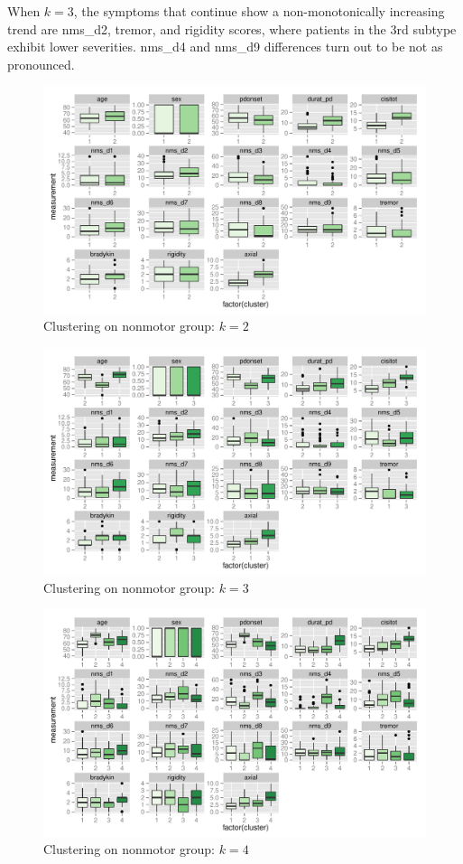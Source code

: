 \documentclass[10pt]{article}
\begin{document}
\begin{multicols}{2}
When $k = 3$, the symptoms that continue show a non-monotonically increasing
trend are nms\_d2, tremor, and rigidity scores, where patients in the 3rd
subtype exhibit lower severities. nms\_d4 and nms\_d9 differences turn out to be
not as pronounced.

\begin{figure}[p]
  \centering
  \includegraphics[width=0.65\linewidth]{c2-summaries-2.pdf}
  \caption{Clustering on nonmotor group: $k = 2$}
  \label{fig:c2-summaries-2}
\end{figure}
\begin{figure}[p]
  \centering
  \includegraphics[width=0.65\linewidth]{c2-summaries-3.pdf}
  \caption{Clustering on nonmotor group: $k = 3$}
  \label{fig:c2-summaries-3}
\end{figure}
\begin{figure}[p]
  \centering
  \includegraphics[width=0.65\linewidth]{c2-summaries-4.pdf}
  \caption{Clustering on nonmotor group: $k = 4$}
  \label{fig:c2-summaries-4}
\end{figure}



\end{multicols}
\end{document}
